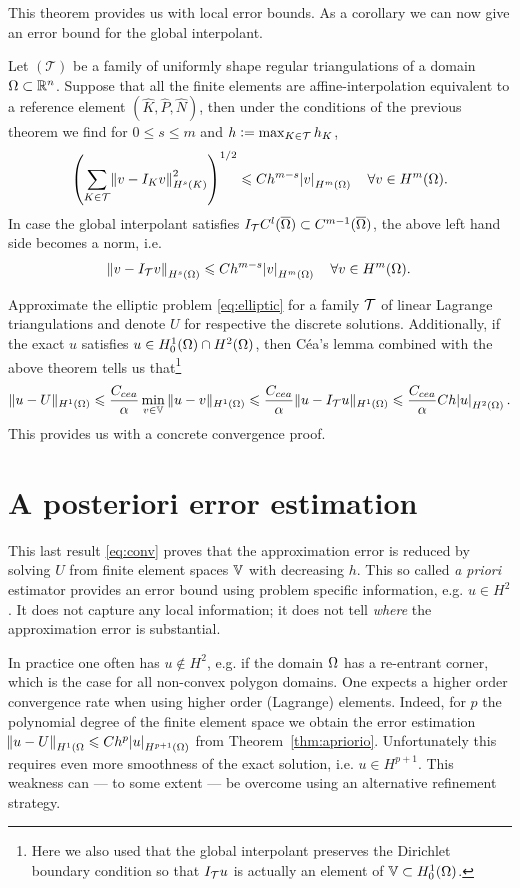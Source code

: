 \documentclass[thesis.tex]{subfiles}
\begin{document}
  This theorem provides us with local error bounds. As a corollary we can now
  give an error bound for the global interpolant.
  \begin{thm}
    \label{thm:apriorio}
    Let $(\mathcal{T})$ be a family of uniformly shape regular triangulations of a domain~$\Omega \subset \mathbb{R}^n$.
    Suppose that all the finite elements are affine-interpolation equivalent to a reference element $(\hat K, \hat P, \hat N)$,
    then under the conditions of the previous theorem we find for $0 \leq s \leq m$ and $h  := \max_{ K \in \mathcal{T}} h_K$,
    \[
      \left( \sum_{K \in \mathcal{T}} \norm{v - I_K v}^2_{H^s(K)}\right)^{1/2} \leqslant C h^{m-s} \abs{v}_{H^m(\Omega)} \quad \forall v \in H^m(\Omega).
    \]
    In case the global interpolant satisfies $I_{\mathcal{T}} C^l(\overline{\Omega}) \subset C^{m-1}(\overline{\Omega})$, the above left hand side becomes a norm, i.e. 
    \[
      \norm{v - I_{\mathcal{T}}v}_{H^s(\Omega)} \leqslant C h^{m-s} \abs{v}_{H^m(\Omega)} \quad \forall v \in H^m(\Omega).
    \]
  \end{thm}
  Approximate the elliptic problem \eqref{eq:elliptic}  for a family $\mathcal{T}$ of linear Lagrange triangulations and denote $U$
  for respective the discrete solutions.
  Additionally, if the exact $u$ satisfies $u \in H_0^1(\Omega)\cap H^2(\Omega)$, then C\'ea's lemma combined with the above theorem tells us that\footnote{
  Here we also used that the global interpolant preserves the Dirichlet boundary condition so that
   $I_{\mathcal{T}} u$ is actually an element of $\mathbb{V} \subset H_0^1(\Omega)$.}
  \begin{equation}
    \label{eq:conv}
    \|u - U\|_{H^1(\Omega)} \leqslant \frac{C_{cea}}{\alpha} \min_{v \in \mathbb{V}} \| u - v\|_{H^1(\Omega)} \leqslant \frac{C_{cea}}{\alpha} \| u - I_{\mathcal{T}}u \|_{H^1(\Omega)} \leqslant \frac{C_{cea}}{\alpha} C  h \abs{u}_{H^2(\Omega)}.
  \end{equation}
  This provides us with a concrete convergence proof.

  \section{A posteriori error estimation}
  \label{sec:afem}
  This last result \eqref{eq:conv} proves that the approximation error is reduced by solving $U$
  from finite element spaces $\mathbb{V}$ with decreasing $h$. This so called \emph{a priori} estimator provides an error bound
  using problem specific information, e.g. $u \in H^2$. It does not capture
  any local information; it does not tell \emph{where} the approximation error is substantial. 
  
  In practice one often has $u \not \in H^2$, e.g. if the domain $\Omega$ has a re-entrant corner, which
  is the case for all non-convex polygon domains. 
  One expects a higher order convergence rate when using higher order (Lagrange) elements.
  Indeed, for $p$ the polynomial degree of the finite element space we obtain the error estimation $\norm{u - U}_{H^1(\Omega} \leqslant C h^{p} \abs{u}_{H^{p+1}(\Omega)}$ from Theorem~\ref{thm:apriorio}. Unfortunately this requires even more smoothness of the exact solution, i.e. $u \in H^{p+1}$. This weakness can --- to some extent ---
  be overcome using an alternative refinement strategy.
  
\end{document}
